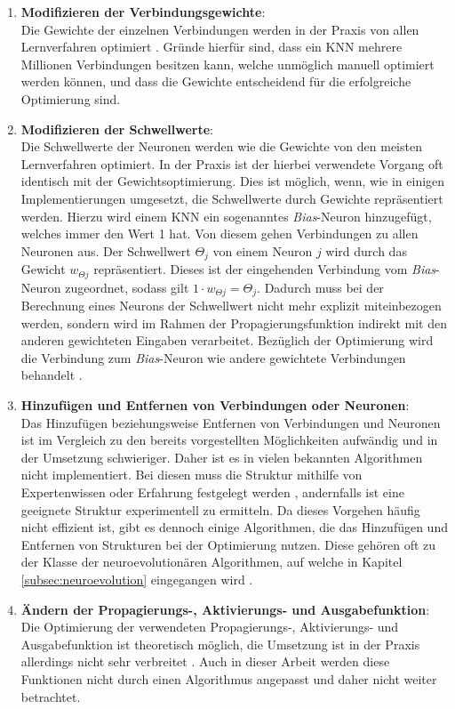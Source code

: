 \begin{enumerate}
	\item \textbf{Modifizieren der Verbindungsgewichte}:\\
	Die Gewichte der einzelnen Verbindungen werden in der Praxis von allen Lernverfahren optimiert \cite{zell2003simulation}. Gründe hierfür sind, dass ein \ac{KNN} mehrere Millionen Verbindungen besitzen kann, welche unmöglich manuell optimiert werden können, und dass die Gewichte entscheidend für die erfolgreiche Optimierung sind.

	\item\textbf{Modifizieren der Schwellwerte}:\\
	Die Schwellwerte der Neuronen werden wie die Gewichte von den meisten Lernverfahren optimiert. In der Praxis ist der hierbei verwendete Vorgang oft identisch mit der Gewichtsoptimierung. Dies ist möglich, wenn, wie in einigen Implementierungen umgesetzt, die Schwellwerte durch Gewichte repräsentiert werden. Hierzu wird einem \ac{KNN} ein sogenanntes \emph{Bias}-Neuron hinzugefügt, welches immer den Wert 1 hat. Von diesem gehen Verbindungen zu allen Neuronen aus. Der Schwellwert $\Theta_j$ von einem Neuron $j$ wird durch das Gewicht $w_{\Theta j}$ repräsentiert. Dieses ist der eingehenden Verbindung vom \emph{Bias}-Neuron zugeordnet, sodass gilt $1\cdot w_{\Theta j} = \Theta_j$. Dadurch muss bei der Berechnung eines Neurons der Schwellwert nicht mehr explizit miteinbezogen werden, sondern wird im Rahmen der Propagierungsfunktion indirekt mit den anderen gewichteten Eingaben verarbeitet. Bezüglich der Optimierung wird die Verbindung zum \emph{Bias}-Neuron wie andere gewichtete Verbindungen behandelt \cite{zell2003simulation}.

	\item \textbf{Hinzufügen und Entfernen von Verbindungen oder Neuronen}:\\
	Das Hinzufügen beziehungsweise Entfernen von Verbindungen und Neuronen ist im Vergleich zu den bereits vorgestellten Möglichkeiten aufwändig und in der Umsetzung schwieriger. Daher ist es in vielen bekannten Algorithmen nicht implementiert. Bei diesen muss die Struktur mithilfe von Expertenwissen oder Erfahrung festgelegt werden \cite{stanley2017oreilly}, andernfalls ist eine geeignete Struktur experimentell zu ermitteln. Da dieses Vorgehen häufig nicht effizient ist, gibt es dennoch einige Algorithmen, die das Hinzufügen und Entfernen von Strukturen bei der Optimierung nutzen. Diese gehören oft zu der Klasse der neuroevolutionären Algorithmen, auf welche in Kapitel \ref{subsec:neuroevolution} eingegangen wird \cite{kriesel2008kleiner}.
	
	\item \textbf{Ändern der Propagierungs-, Aktivierungs- und Ausgabefunktion}:\\
	Die Optimierung der verwendeten Propagierungs-, Aktivierungs- und Ausgabefunktion ist theoretisch möglich, die Umsetzung ist in der Praxis allerdings nicht sehr verbreitet \cite{zell2003simulation}. Auch in dieser Arbeit werden diese Funktionen nicht durch einen Algorithmus angepasst und daher nicht weiter betrachtet. 
\end{enumerate}

